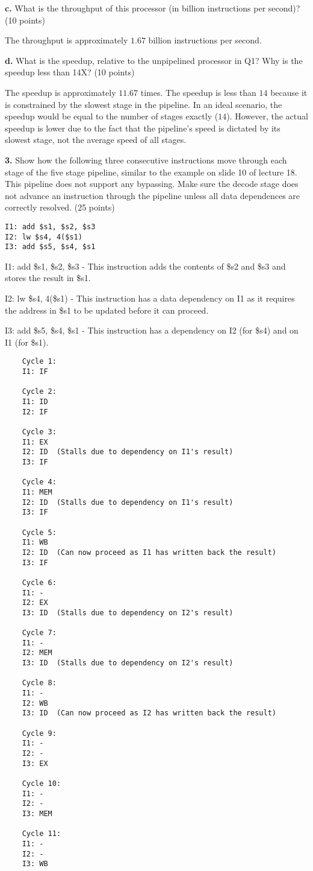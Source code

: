 \documentclass{article}
\begin{document}
\textbf{c.} What is the throughput of this processor (in billion instructions per second)? (10 points)

The throughput is approximately $1.67$ billion instructions per second.

\textbf{d.} What is the speedup, relative to the unpipelined processor in Q1? Why
is the speedup less than 14X? (10 points)

The speedup is approximately $11.67$ times. The speedup is less than $14$ because
it is constrained by the slowest stage in the pipeline. In an ideal scenario, the
speedup would be equal to the number of stages exactly ($14$). However, the actual
speedup is lower due to the fact that the pipeline's speed is dictated by its slowest
stage, not the average speed of all stages.

\newpage

\textbf{3.} Show how the following three consecutive instructions move through each stage
of the five stage pipeline, similar to the example on slide 10 of lecture 18. This pipeline
does not support any bypassing. Make sure the decode stage does not advance an instruction
through the pipeline unless all data dependences are correctly resolved. (25 points)

\begin{verbatim}
I1: add $s1, $s2, $s3
I2: lw $s4, 4($s1)
I3: add $s5, $s4, $s1
\end{verbatim}

I1: add \$s1, \$s2, \$s3 - This instruction adds the contents of \$s2 and \$s3 and
stores the result in \$s1.

I2: lw \$s4, 4(\$s1) - This instruction has a data dependency on I1 as it requires the
address in \$s1 to be updated before it can proceed.

I3: add \$s5, \$s4, \$s1 - This instruction has a dependency on I2 (for \$s4) and on I1
(for \$s1).

\begin{verbatim}
    Cycle 1:
    I1: IF
    
    Cycle 2:
    I1: ID
    I2: IF
    
    Cycle 3:
    I1: EX
    I2: ID  (Stalls due to dependency on I1's result)
    I3: IF
    
    Cycle 4:
    I1: MEM
    I2: ID  (Stalls due to dependency on I1's result)
    I3: IF
    
    Cycle 5:
    I1: WB
    I2: ID  (Can now proceed as I1 has written back the result)
    I3: IF
    
    Cycle 6:
    I1: -
    I2: EX
    I3: ID  (Stalls due to dependency on I2's result)
    
    Cycle 7:
    I1: -
    I2: MEM
    I3: ID  (Stalls due to dependency on I2's result)
    
    Cycle 8:
    I1: -
    I2: WB
    I3: ID  (Can now proceed as I2 has written back the result)
    
    Cycle 9:
    I1: -
    I2: -
    I3: EX
    
    Cycle 10:
    I1: -
    I2: -
    I3: MEM
    
    Cycle 11:
    I1: -
    I2: -
    I3: WB
\end{verbatim}
\end{document}
